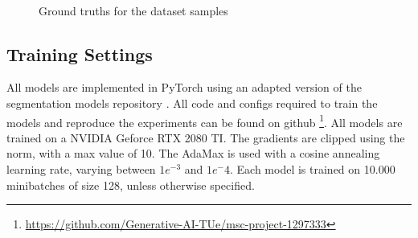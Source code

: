 \begin{figure}
    \centering
    \\
    \caption{\label{fig:coco-samples}Ground truths for the dataset samples}
\end{figure}


\subsection{Training Settings}
All models are implemented in PyTorch \cite{Ansel_PyTorch_2_Faster_2024} using an adapted version of the segmentation models repository \cite{Iakubovskii:2019}. All code and configs required to train the models and reproduce the experiments can be found on github \footnote[1]{\url{https://github.com/Generative-AI-TUe/msc-project-1297333}}. All models are trained on a NVIDIA Geforce RTX 2080 TI. The gradients are clipped using the norm, with a max value of 10. The AdaMax\cite{kingma2017adammethodstochasticoptimization} is used with a cosine annealing learning rate, varying between $1e^{-3}$ and $1e^-4$. Each model is trained on 10.000 minibatches of size 128, unless otherwise specified.


